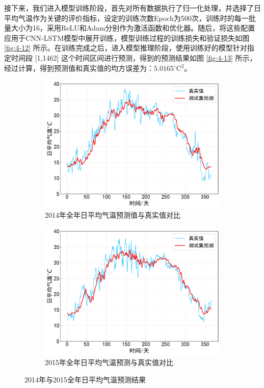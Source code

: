 接下来，我们进入模型训练阶段，首先对所有数据执行了归一化处理，并选择了日平均气温作为关键的评价指标，设定的训练次数Epoch为500次，训练时的每一批量大小为16，采用ReLU和Adam分别作为激活函数和优化器。随后，将这些配置应用于CNN-LSTM模型中展开训练，模型训练过程的训练损失和验证损失如图 \ref{fig:4-12} 所示。在训练完成之后，进入模型推理阶段，使用训练好的模型针对指定时间段 [1,1462] 这个时间区间进行预测，得到的预测结果如图 \ref{fig:4-13} 所示，经过计算，得到预测值和真实值的均方误差为：$5.0165 {}^{\circ}\text{C}{}^2$。

\begin{figure}[h]
  \centering
  \begin{subfigure}{0.48\textwidth}
    \centering
    \includegraphics[width=\linewidth]{./Img/CNN_LSTM_test_first_pre.pdf}
    \caption{2014年全年日平均气温预测值与真实值对比}\label{fig:4-14}
  \end{subfigure}
  \hfil
  \begin{subfigure}{0.48\textwidth}
    \centering
    \includegraphics[width=\linewidth]{./Img/CNN_LSTM_test_section_pre.pdf}
    \caption{2015年全年日平均气温预测与真实值对比}\label{fig:4-15}
  \end{subfigure}
  \caption{2014年与2015全年日平均气温预测结果}
  \label{fig:4-17-all}
\end{figure}

